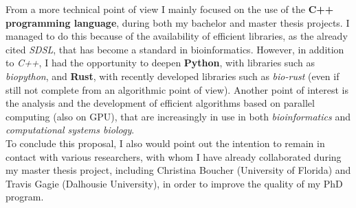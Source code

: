 \documentclass[a4paper,11pt, oneside]{article}
\begin{document}
From a more technical point of view I mainly focused on the use of the
\textbf{C++ programming language}, during both my bachelor and master
thesis projects. I managed to do this because of the availability of efficient
libraries, as the already 
cited \textit{SDSL}, that has become a standard in bioinformatics. However, in
addition to \textit{C++}, I had the opportunity to deepen 
\textbf{Python}, with libraries such as \textit{biopython}, and \textbf{Rust},
with recently developed libraries such as \textit{bio-rust} (even if still not
complete from an algorithmic point of view). Another point of interest is the
analysis and the development of efficient algorithms based on parallel computing
(also on GPU), that are increasingly in use in both \textit{bioinformatics} and
\textit{computational systems biology}. \\  
To conclude this proposal, I also would point out the intention to remain in
contact with various researchers, with whom I have already collaborated during 
my master thesis project, including Christina Boucher (University of Florida)
and Travis Gagie (Dalhousie University), in order to improve the quality of my
PhD program.  


\end{document}
